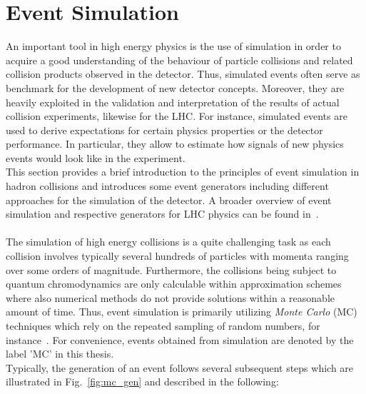 \section{Event Simulation}
\label{sec:simulation}
An important tool in high energy physics is the use of simulation in order to acquire a good understanding of the behaviour of particle collisions and related collision products observed in the detector. Thus, simulated events often serve as benchmark for the development of new detector concepts. Moreover, they are heavily exploited in the validation and interpretation of the results of actual collision experiments, likewise for the LHC. For instance, simulated events are used to derive expectations for certain physics properties or the detector performance. In particular, they allow to estimate how signals of new physics events would look like in the experiment. \\
This section provides a brief introduction to the principles of event simulation in hadron collisions and introduces some event generators including different approaches for the simulation of the detector. A broader overview of event simulation and respective generators for LHC physics can be found in~\cite{Seymour:2013ega, Buckley:2011ms}. \\
\\
The simulation of high energy collisions is a quite challenging task as each collision involves typically several hundreds of particles with momenta ranging over some orders of magnitude. Furthermore, the collisions being subject to quantum chromodynamics are only calculable within approximation schemes where also numerical methods do not provide solutions within a reasonable amount of time. Thus, event simulation is primarily utilizing \textit{Monte Carlo} (MC) techniques which rely on the repeated sampling of random numbers, \cf for instance~\cite{bib:MCMethod}. For convenience, events obtained from simulation are denoted by the label 'MC' in this thesis. \\
Typically, the generation of an event follows several subsequent steps which are illustrated in Fig.~\ref{fig:mc_gen} and described in the following: 
